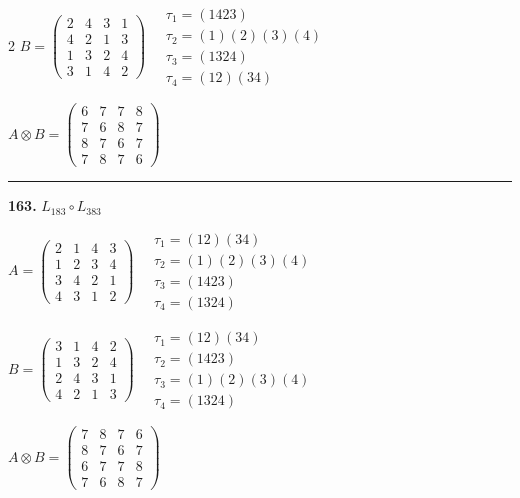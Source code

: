 \begin{multicols}{2}
$B = \begin{pmatrix} 2 & 4 & 3 & 1 \\ 4 & 2 & 1 & 3 \\ 1 & 3 & 2 & 4 \\ 3 & 1 & 4 & 2 \end{pmatrix} \quad \begin{matrix} \tau_{1}=(1 4 2 3) \\ \tau_{2}=(1)(2)(3)(4) \\ \tau_{3}=(1 3 2 4) \\ \tau_{4}=(1 2)(3 4) \end{matrix}$

$A \otimes B = \begin{pmatrix} 6 & 7 & 7 & 8 \\ 7 & 6 & 8 & 7 \\ 8 & 7 & 6 & 7 \\ 7 & 8 & 7 & 6 \end{pmatrix}$

\vspace{0.3em}
\hrule
\vspace{0.3em}

\noindent\textbf{163.} $L_{183} \circ L_{383}$

$A = \begin{pmatrix} 2 & 1 & 4 & 3 \\ 1 & 2 & 3 & 4 \\ 3 & 4 & 2 & 1 \\ 4 & 3 & 1 & 2 \end{pmatrix} \quad \begin{matrix} \tau_{1}=(1 2)(3 4) \\ \tau_{2}=(1)(2)(3)(4) \\ \tau_{3}=(1 4 2 3) \\ \tau_{4}=(1 3 2 4) \end{matrix}$

$B = \begin{pmatrix} 3 & 1 & 4 & 2 \\ 1 & 3 & 2 & 4 \\ 2 & 4 & 3 & 1 \\ 4 & 2 & 1 & 3 \end{pmatrix} \quad \begin{matrix} \tau_{1}=(1 2)(3 4) \\ \tau_{2}=(1 4 2 3) \\ \tau_{3}=(1)(2)(3)(4) \\ \tau_{4}=(1 3 2 4) \end{matrix}$

$A \otimes B = \begin{pmatrix} 7 & 8 & 7 & 6 \\ 8 & 7 & 6 & 7 \\ 6 & 7 & 7 & 8 \\ 7 & 6 & 8 & 7 \end{pmatrix}$


\end{multicols}
